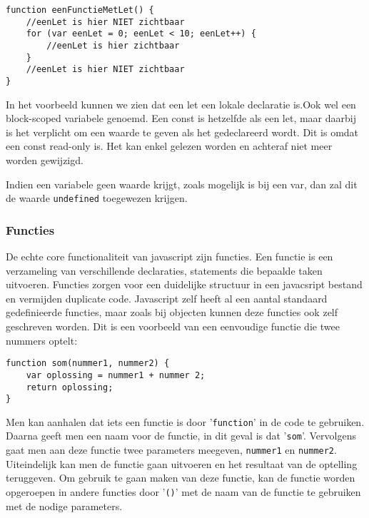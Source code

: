 \begin{lstlisting}[frame=single, caption=Een functie met let]
function eenFunctieMetLet() {
	//eenLet is hier NIET zichtbaar
	for (var eenLet = 0; eenLet < 10; eenLet++) {
		//eenLet is hier zichtbaar
	}
	//eenLet is hier NIET zichtbaar
}
\end{lstlisting}

In het voorbeeld kunnen we zien dat een let een lokale declaratie is.Ook wel een block-scoped variabele genoemd. Een const is hetzelfde als een let, maar daarbij is het verplicht om een waarde te geven als het gedeclareerd wordt. Dit is omdat een const read-only is. Het kan enkel gelezen worden en achteraf niet meer worden gewijzigd.

Indien een variabele geen waarde krijgt, zoals mogelijk is bij een var, dan zal dit de waarde \lstinline[basicstyle=\ttfamily\color{red}]|undefined| toegewezen krijgen.

\subsubsection{Functies}
\label{sssec:functies}
De echte core functionaliteit van javascript zijn functies. Een functie is een verzameling van verschillende declaraties, statements die bepaalde taken uitvoeren. Functies zorgen voor een duidelijke structuur in een javacsript bestand en vermijden duplicate code. Javascript zelf heeft al een aantal standaard gedefinieerde functies, maar zoals bij objecten kunnen deze functies ook zelf geschreven worden. Dit is een voorbeeld van een eenvoudige functie die twee nummers optelt:

\begin{lstlisting}[frame=single, caption=Een functie die twee getallen optelt]
function som(nummer1, nummer2) {
	var oplossing = nummer1 + nummer 2;
	return oplossing;
}
\end{lstlisting}

Men kan aanhalen dat iets een functie is door '\lstinline[basicstyle=\ttfamily\color{red}]|function|' in de code te gebruiken. Daarna geeft men een naam voor de functie, in dit geval is dat '\lstinline[basicstyle=\ttfamily\color{red}]|som|'. Vervolgens gaat men aan deze functie twee parameters meegeven, \lstinline[basicstyle=\ttfamily\color{red}]|nummer1| en \lstinline[basicstyle=\ttfamily\color{red}]|nummer2|. Uiteindelijk kan men de functie gaan uitvoeren en het resultaat van de optelling teruggeven. Om gebruik te gaan maken van deze functie, kan de functie worden opgeroepen in andere functies door '\lstinline[basicstyle=\ttfamily\color{red}]|()|' met de naam van de functie te gebruiken met de nodige parameters.


